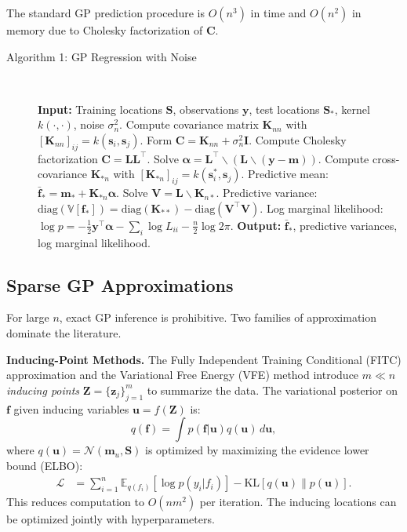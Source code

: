 \documentclass[conference]{IEEEtran}
\begin{document}
The standard GP prediction procedure is $O(n^3)$ in time and $O(n^2)$ in memory due to Cholesky factorization of $\mathbf{C}$.

\begin{description}
\item[Algorithm 1: GP Regression with Noise]~
\begin{algorithmic}[1]
\STATE \textbf{Input:} Training locations $\mathbf{S}$, observations $\mathbf{y}$, test locations $\mathbf{S}_*$, kernel $k(\cdot,\cdot)$, noise $\sigma_n^2$.
\STATE Compute covariance matrix $\mathbf{K}_{nn}$ with $[\mathbf{K}_{nn}]_{ij} = k(\mathbf{s}_i, \mathbf{s}_j)$.
\STATE Form $\mathbf{C} = \mathbf{K}_{nn} + \sigma_n^2\mathbf{I}$.
\STATE Compute Cholesky factorization $\mathbf{C} = \mathbf{L}\mathbf{L}^\top$.
\STATE Solve $\bm{\alpha} = \mathbf{L}^\top \backslash (\mathbf{L} \backslash (\mathbf{y} - \mathbf{m}))$.
\STATE Compute cross-covariance $\mathbf{K}_{*n}$ with $[\mathbf{K}_{*n}]_{ij} = k(\mathbf{s}_i^*, \mathbf{s}_j)$.
\STATE Predictive mean: $\bar{\mathbf{f}}_* = \mathbf{m}_* + \mathbf{K}_{*n}\bm{\alpha}$.
\STATE Solve $\mathbf{V} = \mathbf{L} \backslash \mathbf{K}_{n*}$.
\STATE Predictive variance: $\text{diag}(\mathbb{V}[\mathbf{f}_*]) = \text{diag}(\mathbf{K}_{**}) - \text{diag}(\mathbf{V}^\top \mathbf{V})$.
\STATE Log marginal likelihood: $\log p = -\frac{1}{2}\mathbf{y}^\top\bm{\alpha} - \sum_i \log L_{ii} - \frac{n}{2}\log 2\pi$.
\STATE \textbf{Output:} $\bar{\mathbf{f}}_*$, predictive variances, log marginal likelihood.
\end{algorithmic}
\end{description}

\subsection{Sparse GP Approximations}

For large $n$, exact GP inference is prohibitive. Two families of approximation dominate the literature.

\textbf{Inducing-Point Methods.} The Fully Independent Training Conditional (FITC) approximation \cite{snelson2006sparse} and the Variational Free Energy (VFE) method \cite{titsias2009variational} introduce $m \ll n$ \emph{inducing points} $\mathbf{Z} = \{\mathbf{z}_j\}_{j=1}^m$ to summarize the data. The variational posterior on $\mathbf{f}$ given inducing variables $\mathbf{u} = f(\mathbf{Z})$ is:
\begin{equation}
  q(\mathbf{f}) = \int p(\mathbf{f}|\mathbf{u}) q(\mathbf{u})\, d\mathbf{u},
  \label{eq:var_posterior}
\end{equation}
where $q(\mathbf{u}) = \mathcal{N}(\mathbf{m}_u, \mathbf{S})$ is optimized by maximizing the evidence lower bound (ELBO):
\begin{align}
  \mathcal{L} &= \sum_{i=1}^n \mathbb{E}_{q(f_i)}\!\left[\log p(y_i | f_i)\right] - \mathrm{KL}[q(\mathbf{u}) \| p(\mathbf{u})].
  \label{eq:elbo}
\end{align}
This reduces computation to $O(nm^2)$ per iteration. The inducing locations can be optimized jointly with hyperparameters.
\end{document}
